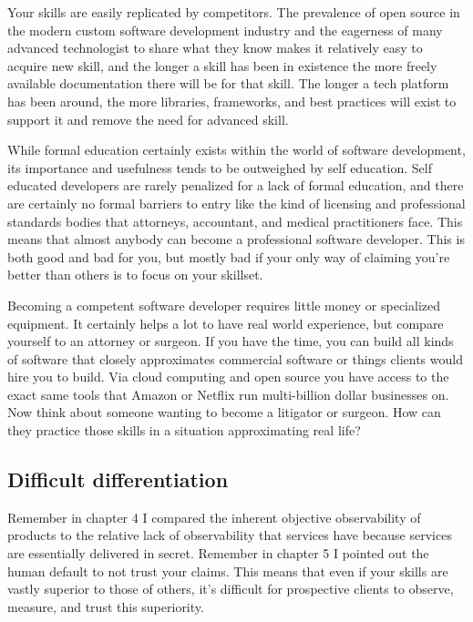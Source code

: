 Your skills are easily replicated by competitors. The prevalence of open source in the modern custom software development industry and the eagerness of many advanced technologist to share what they know makes it relatively easy to acquire new skill, and the longer a skill has been in existence the more freely available documentation there will be for that skill. The longer a tech platform has been around, the more libraries, frameworks, and best practices will exist to support it and remove the need for advanced skill.

While formal education certainly exists within the world of software development, its importance and usefulness tends to be outweighed by self education. Self educated developers are rarely penalized for a lack of formal education, and there are certainly no formal barriers to entry like the kind of licensing and professional standards bodies that attorneys, accountant, and medical practitioners face. This means that almost anybody can become a professional software developer. This is both good and bad for you, but mostly bad if your only way of claiming you're better than others is to focus on your skillset.

Becoming a competent software developer requires little money or specialized equipment. It certainly helps a lot to have real world experience, but compare yourself to an attorney or surgeon. If you have the time, you can build all kinds of software that closely approximates commercial software or things clients would hire you to build. Via cloud computing and open source you have access to the exact same tools that Amazon or Netflix run multi-billion dollar businesses on. Now think about someone wanting to become a litigator or surgeon. How can they practice those skills in a situation approximating real life?

\subsection{Difficult differentiation}

Remember in chapter 4 I compared the inherent objective observability of products to the relative lack of observability that services have because services are essentially delivered in secret. Remember in chapter 5 I pointed out the human default to not trust your claims. This means that even if your skills are vastly superior to those of others, it's difficult for prospective clients to observe, measure, and trust this superiority.

